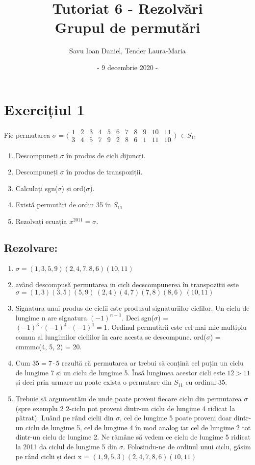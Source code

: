 \documentclass{article}
\title{Tutoriat 6 - Rezolvări \\
\Large  Grupul de permutări}
\date{- 9 decembrie 2020 -}
\author{Savu Ioan Daniel, Tender Laura-Maria}
\begin{document}
\maketitle
\section{Exercițiul 1}
Fie permutarea $\sigma$ = $\bigl(\begin{smallmatrix}
    1 & 2 & 3 & 4 & 5 & 6 & 7 & 8 & 9 & 10 & 11 \\
    3 & 4 & 5 & 7 & 9 & 2 & 8 & 6 & 1 & 11 & 10
  \end{smallmatrix}\bigr)$ $\in S_{11}$
\begin{enumerate}
    \item Descompuneți $\sigma$ în produs de cicli dijuncți.
    \item Descompuneți $\sigma$ în produs de transpoziții.
    \item Calculați sgn($\sigma$) și ord($\sigma$).
    \item Există permutări de ordin 35 în $S_{11}$
    \item Rezolvați ecuația $x^{2011} = \sigma$.
\end{enumerate}


\subsection{Rezolvare:}

\begin{enumerate}
    \item $\sigma = (1, 3, 5, 9)(2, 4, 7, 8, 6)(10, 11)$
    \item având descompusă permutarea in cicli decscompunerea în transpoziții este $\sigma = 
    (1, 3)(3, 5)(5, 9) \ (2, 4)(4, 7)(7, 8)(8, 6) \ (10, 11)$
    \item Signatura unui produs de ciclii este produsul signaturiilor ciclilor. Un ciclu de lungime n are signatura $(-1)^{n-1}$. Deci sgn($\sigma$) = $(-1)^{3}\cdot(-1)^{4}\cdot(-1)^{1} = 1$. Ordinul permutării este cel mai mic multiplu comun al lungimilor cicliilor în care acesta se descompune. ord($\sigma$) = cmmmc(4, 5, 2) = 20.
    \item Cum $35 = 7 \cdot 5$ rezultă că permutarea ar trebui să conțină cel puțin un ciclu de lungime 7 și un ciclu de lungime 5. Însă lungimea acestor cicli este $12 > 11$ și deci prin urmare nu poate exista o permutare din $S_{11}$ cu ordinul 35.
    \item Trebuie să argumentăm de unde poate proveni fiecare ciclu din permutarea $\sigma$ (spre exemplu 2 2-ciclu pot proveni dintr-un ciclu de lungime 4 ridicat la pătrat). Luând pe rând ciclii din $\sigma$, cel de lungime 5 poate proveni doar dintr-un ciclu de lungime 5, cel de lungime 4 în mod analog iar cel de lungime 2 tot dintr-un ciclu de lungime 2. Ne rămâne să vedem ce ciclu de lungime 5 ridicat la 2011 da ciclul de lungime 5 din $\sigma$. Folosindu-ne de ordinul unui ciclu, găsim pe rând ciclii și deci x = $(1, 9, 5, 3)(2, 4, 7, 8, 6)(10, 11)$
    
\end {enumerate}
\end{document}
